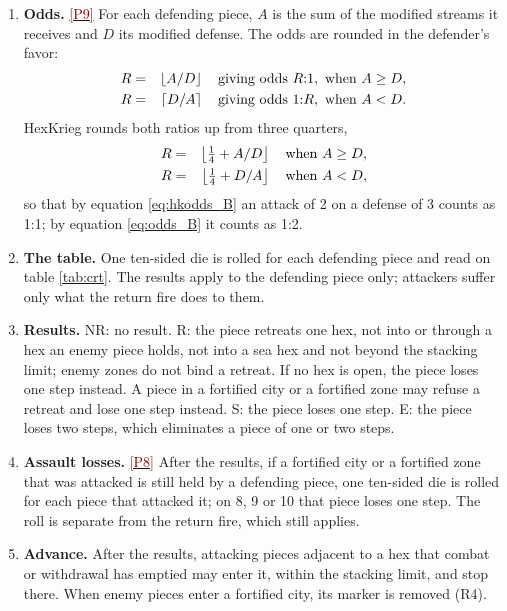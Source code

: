 \documentclass[11pt]{article}
\newcommand{\ptest}[1]{\hyperlink{ptest}{\textcolor{darkred}{[P#1]}}}
\begin{document}
\begin{enumerate}
\item \textbf{Odds.} \ptest{9} For each defending piece, $A$ is the sum of the modified streams it receives and $D$ its modified defense. The odds are rounded in the defender's favor:
\begin{eqnarray}
R &=& \left\lfloor A/D \right\rfloor \mbox{\quad giving odds } R{:}1, \mbox{ when } A \ge D, \label{eq:odds_A}\\
R &=& \left\lceil D/A \right\rceil \mbox{\quad giving odds } 1{:}R, \mbox{ when } A < D. \label{eq:odds_B}
\end{eqnarray}
HexKrieg rounds both ratios up from three quarters,
\begin{eqnarray}
R &=& \left\lfloor \tfrac{1}{4}+A/D \right\rfloor \mbox{\quad when } A \ge D, \label{eq:hkodds_A}\\
R &=& \left\lfloor \tfrac{1}{4}+D/A \right\rfloor \mbox{\quad when } A < D, \label{eq:hkodds_B}
\end{eqnarray}
so that by equation \eqref{eq:hkodds_B} an attack of 2 on a defense of 3 counts as 1:1; by equation \eqref{eq:odds_B} it counts as 1:2.
\item \textbf{The table.} One ten-sided die is rolled for each defending piece and read on table \ref{tab:crt}. The results apply to the defending piece only; attackers suffer only what the return fire does to them.
\item \textbf{Results.} NR: no result. R: the piece retreats one hex, not into or through a hex an enemy piece holds, not into a sea hex and not beyond the stacking limit; enemy zones do not bind a retreat. If no hex is open, the piece loses one step instead. A piece in a fortified city or a fortified zone may refuse a retreat and lose one step instead. S: the piece loses one step. E: the piece loses two steps, which eliminates a piece of one or two steps.
\item \textbf{Assault losses.} \ptest{8} After the results, if a fortified city or a fortified zone that was attacked is still held by a defending piece, one ten-sided die is rolled for each piece that attacked it; on 8, 9 or 10 that piece loses one step. The roll is separate from the return fire, which still applies.
\item \textbf{Advance.} After the results, attacking pieces adjacent to a hex that combat or withdrawal has emptied may enter it, within the stacking limit, and stop there. When enemy pieces enter a fortified city, its marker is removed (R4).
\end{enumerate}
\end{document}
